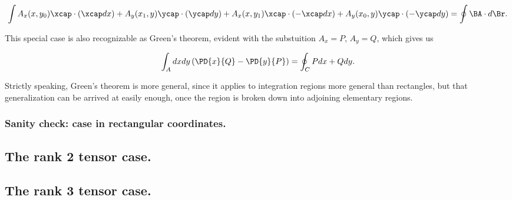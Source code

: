 \begin{equation}\label{eqn:stokesTensor:n}
\int
A_x(x, y_0) \xcap \cdot ( \xcap dx )
+ A_y(x_1, y) \ycap \cdot ( \ycap dy )
+ A_x(x, y_1) \xcap \cdot ( -\xcap dx )
+ A_y(x_0, y) \ycap \cdot ( -\ycap dy )
= \oint \BA \cdot d\Br.
\end{equation}

This special case is also recognizable as Green's theorem, evident with the substuition $A_x = P$, $A_y = Q$, which gives us

\begin{equation}\label{eqn:stokesTensor:n}
\int_A dx dy \left( \PD{x}{Q} - \PD{y}{P} \right)
=
\oint_C P dx + Q dy.
\end{equation}

Strictly speaking, Green's theorem is more general, since it applies to integration regions more general than rectangles, but that generalization can be arrived at easily enough, once the region is broken down into adjoining elementary regions.

\subsubsection{Sanity check:  case in rectangular coordinates.}

\subsection{The rank 2 tensor case.}
\subsection{The rank 3 tensor case.}

\EndArticle
